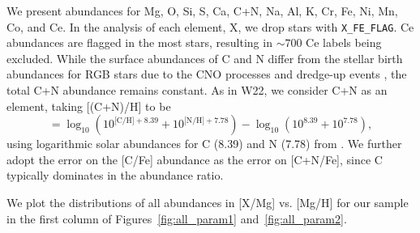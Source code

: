 \documentclass[modern]{aastex631}
\begin{document}
We present abundances for Mg, O, Si, S, Ca, C+N, Na, Al, K, Cr, Fe, Ni, Mn, Co, and Ce. In the analysis of each element, X, we drop stars with \texttt{X\_FE\_FLAG}. Ce abundances are flagged in the most stars, resulting in $\sim 700$ Ce labels being excluded. While the surface abundances of C and N differ from the stellar birth abundances for RGB stars due to the CNO processes and dredge-up events \citep{iben1965, shetrone2019}, the total C+N abundance remains constant. As in W22, we consider C+N as an element, taking [(C+N)/H] to be 
\begin{equation}
    [\text{C+N}/\text{H}] = \log_{10}(10^{\text{[C/H]}+8.39} + 10^{\text{[N/H]}+7.78}) - \log_{10}(10^{8.39} + 10^{7.78}),
\end{equation}
using logarithmic solar abundances for C (8.39) and N (7.78) from \citet{grevesse2007}. We further adopt the error on the [C/Fe] abundance as the error on [C+N/Fe], since C typically dominates in the abundance ratio.

We plot the distributions of all abundances in [X/Mg] vs. [Mg/H] for our sample in the first column of Figures~\ref{fig:all_param1} and~\ref{fig:all_param2}. 
\end{document}
